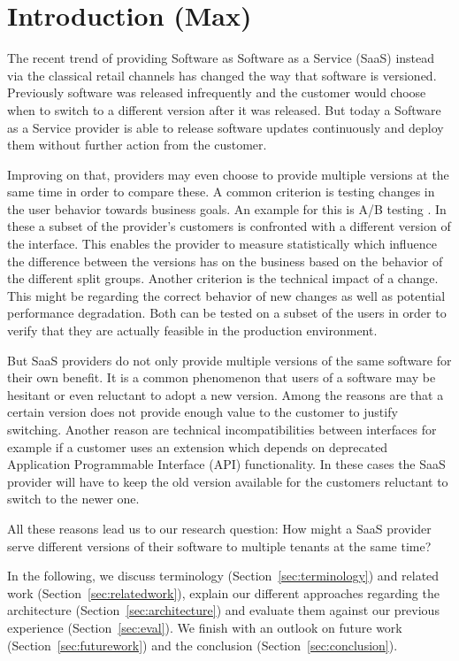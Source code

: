 
\section{Introduction (Max)}

The recent trend of providing Software as Software as a Service (SaaS) instead via the classical retail channels has changed the way that software is versioned. Previously software was released infrequently and the customer would choose when to switch to a different version after it was released. But today a Software as a Service provider is able to release software updates continuously and deploy them without further action from the customer.

Improving on that, providers may even choose to provide multiple versions at the same time in order to compare these. A common criterion is testing changes in the user behavior towards business goals. An example for this is A/B testing \cite{Kohavi2007}. In these a subset of the provider's customers is confronted with a different version of the interface. This enables the provider to measure statistically which influence the difference between the versions has on the business based on the behavior of the different split groups. Another criterion is the technical impact of a change. This might be regarding the correct behavior of new changes as well as potential performance degradation. Both can be tested on a subset of the users in order to verify that they are actually feasible in the production environment.

But SaaS providers do not only provide multiple versions of the same software for their own benefit. It is a common phenomenon that users of a software may be hesitant or even reluctant to adopt a new version. Among the reasons are that a certain version does not provide enough value to the customer to justify switching. Another reason are technical incompatibilities between interfaces for example if a customer uses an extension which depends on deprecated Application Programmable Interface (API) functionality.
In these cases the SaaS provider will have to keep the old version available for the customers reluctant to switch to the newer one.

All these reasons lead us to our research question: How might a SaaS provider serve different versions of their software to multiple tenants at the same time?

In the following, we discuss terminology (Section~\ref{sec:terminology}) and related work (Section~\ref{sec:relatedwork}), explain our different approaches regarding the architecture (Section~\ref{sec:architecture}) and evaluate them against our previous experience (Section~\ref{sec:eval}). We finish with an outlook on future work (Section~\ref{sec:futurework}) and the conclusion (Section~\ref{sec:conclusion}).


